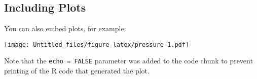\documentclass[
]{article}
\begin{document}
\hypertarget{including-plots}{%
\subsection{Including Plots}\label{including-plots}}

You can also embed plots, for example:

\texttt{[image: Untitled\_files/figure-latex/pressure-1.pdf]}

Note that the \texttt{echo\ =\ FALSE} parameter was added to the code
chunk to prevent printing of the R code that generated the plot.
\end{document}
